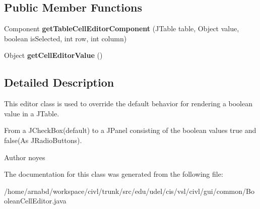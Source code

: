 \subsection*{Public Member Functions}
\begin{DoxyCompactItemize}
\item 
\hypertarget{classedu_1_1udel_1_1cis_1_1vsl_1_1civl_1_1gui_1_1common_1_1BooleanCellEditor_a7bf152dfad9909072a18d43276bbc643}{}Component {\bfseries get\+Table\+Cell\+Editor\+Component} (J\+Table table, Object value, boolean is\+Selected, int row, int column)\label{classedu_1_1udel_1_1cis_1_1vsl_1_1civl_1_1gui_1_1common_1_1BooleanCellEditor_a7bf152dfad9909072a18d43276bbc643}

\item 
\hypertarget{classedu_1_1udel_1_1cis_1_1vsl_1_1civl_1_1gui_1_1common_1_1BooleanCellEditor_a5e25d89bca32087d66156b8e3afa61ce}{}Object {\bfseries get\+Cell\+Editor\+Value} ()\label{classedu_1_1udel_1_1cis_1_1vsl_1_1civl_1_1gui_1_1common_1_1BooleanCellEditor_a5e25d89bca32087d66156b8e3afa61ce}

\end{DoxyCompactItemize}


\subsection{Detailed Description}
This editor class is used to override the default behavior for rendering a boolean value in a J\+Table. 

From a J\+Check\+Box(default) to a J\+Panel consisting of the boolean values true and false(\+As J\+Radio\+Buttons).

\begin{DoxyAuthor}{Author}
noyes 
\end{DoxyAuthor}


The documentation for this class was generated from the following file\+:\begin{DoxyCompactItemize}
\item 
/home/arnabd/workspace/civl/trunk/src/edu/udel/cis/vsl/civl/gui/common/Boolean\+Cell\+Editor.\+java\end{DoxyCompactItemize}
